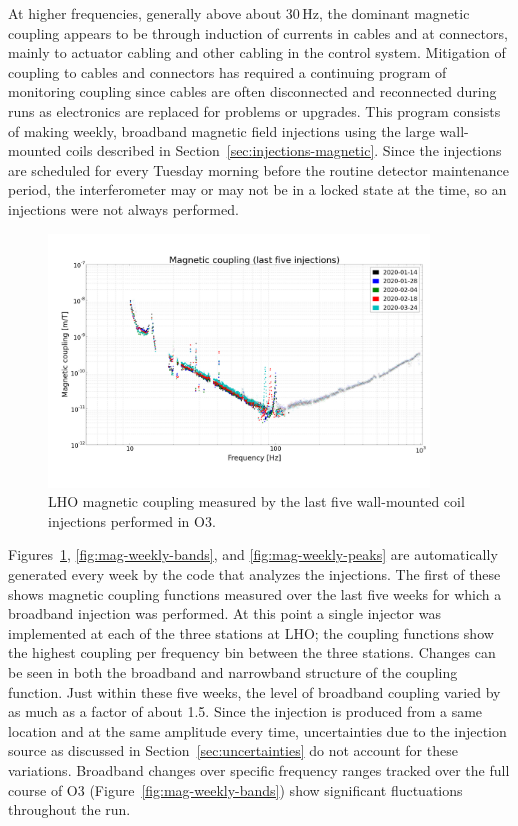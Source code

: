 At higher frequencies, generally above about 30\,Hz, the dominant magnetic coupling appears to be through induction of currents in cables and at connectors, mainly to actuator cabling and other cabling in the control system.
Mitigation of coupling to cables and connectors has required a continuing program of monitoring coupling since cables are often disconnected and reconnected during runs as electronics are replaced for problems or upgrades.
This program consists of making weekly, broadband magnetic field injections using the large wall-mounted coils described in Section~\ref{sec:injections-magnetic}.
Since the injections are scheduled for every Tuesday morning before the routine detector maintenance period, the interferometer may or may not be in a locked state at the time, so an injections were not always performed.

\begin{figure}
	\centering
	\includegraphics[width=0.9\textwidth]{figures/noise-studies/mag-weekly-cf.png}
	\caption{
		LHO magnetic coupling measured by the last five wall-mounted coil injections performed in O3.}
	\label{fig:mag-weekly-cf}
\end{figure}

Figures~\ref{fig:mag-weekly-cf}, \ref{fig:mag-weekly-bands}, and \ref{fig:mag-weekly-peaks} are automatically generated every week by the code that analyzes the injections.
The first of these shows magnetic coupling functions measured over the last five weeks for which a broadband injection was performed.
At this point a single injector was implemented at each of the three stations at LHO; the coupling functions show the highest coupling per frequency bin between the three stations.
Changes can be seen in both the broadband and narrowband structure of the coupling function.
Just within these five weeks, the level of broadband coupling varied by as much as a factor of about 1.5.
Since the injection is produced from a same location and at the same amplitude every time, uncertainties due to the injection source as discussed in Section~\ref{sec:uncertainties} do not account for these variations.
Broadband changes over specific frequency ranges tracked over the full course of \ac{O3} (Figure~\ref{fig:mag-weekly-bands}) show significant fluctuations throughout the run.

